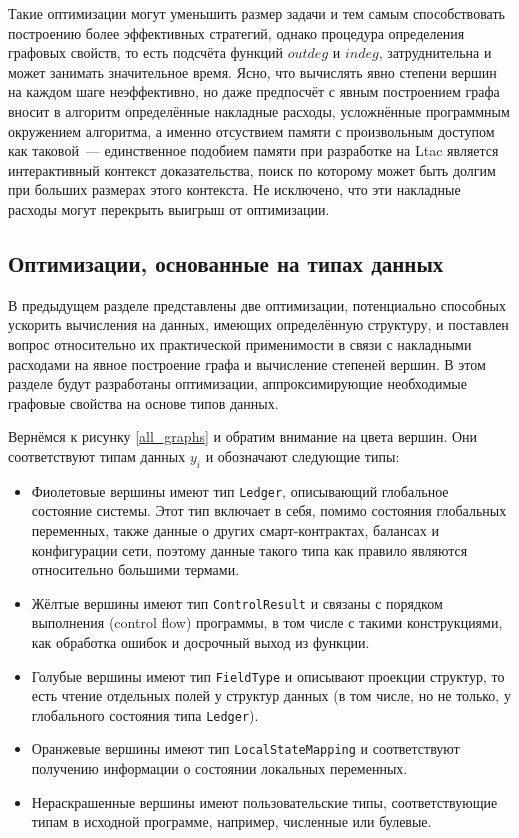 \documentclass[../diploma.tex]{subfiles}
\begin{document}
Такие оптимизации могут уменьшить размер задачи и тем самым способствовать построению более эффективных стратегий, однако процедура определения графовых свойств, то есть подсчёта функций $outdeg$ и $indeg$, затруднительна и может занимать значительное время. Ясно, что вычислять явно степени вершин на каждом шаге неэффективно, но даже предпосчёт с явным построением графа вносит в алгоритм определённые накладные расходы, усложнённые программным окружением алгоритма, а именно отсуствием памяти с произвольным доступом как таковой~--- единственное подобием памяти при разработке на Ltac является интерактивный контекст доказательства, поиск по которому может быть долгим при больших размерах этого контекста. Не исключено, что эти накладные расходы могут перекрыть выигрыш от оптимизации.

\subsection{Оптимизации, основанные на типах данных}\label{typebased}

В предыдущем разделе представлены две оптимизации, потенциально способных ускорить вычисления на данных, имеющих определённую структуру, и поставлен вопрос относительно их практической применимости в связи с накладными расходами на явное построение графа и вычисление степеней вершин. В этом разделе будут разработаны оптимизации, аппроксимирующие необходимые графовые свойства на основе типов данных.

Вернёмся к рисунку \ref{all_graphs} и обратим внимание на цвета вершин. Они соответствуют типам данных $y_i$ и обозначают следующие типы:

\begin{itemize}
    \item Фиолетовые вершины имеют тип \texttt{Ledger}, описывающий глобальное состояние системы. Этот тип включает в себя, помимо состояния глобальных переменных, также данные о других смарт-контрактах, балансах и конфигурации сети, поэтому данные такого типа как правило являются относительно большими термами.
    \item Жёлтые вершины имеют тип \texttt{ControlResult} и связаны с порядком выполнения (control flow) программы, в том числе с такими конструкциями, как обработка ошибок и досрочный выход из функции.
    \item Голубые вершины имеют тип \texttt{FieldType} и описывают проекции структур, то есть чтение отдельных полей у структур данных (в том числе, но не только, у глобального состояния типа \texttt{Ledger}).
    \item Оранжевые вершины имеют тип \texttt{LocalStateMapping} и соответствуют получению информации о состоянии локальных переменных.
    \item Нераскрашенные вершины имеют пользовательские типы, соответствующие типам в исходной программе, например, численные или булевые.
\end{itemize}
\end{document}
